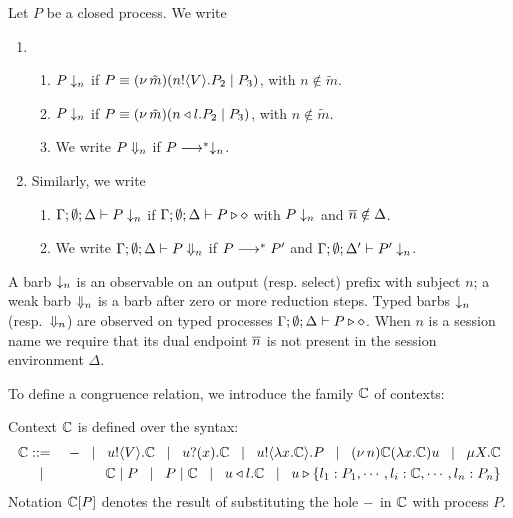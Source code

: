 \begin{definition}[Barbs]
	Let $P$ be a closed process. We write
	\begin{enumerate}
		\item
				\begin{enumerate}
					\item	$P \downarrow_{n}$ if $P \equiv (\nu\, \tilde{m})(n ! \langle V \rangle . P_2 \;|\; P_3)$, with $n \notin \tilde{m}$.
					\item	$P \downarrow_{n}$ if $P \equiv (\nu\, \tilde{m})(n \triangleleft l . P_2 \;|\; P_3)$, with $n \notin \tilde{m}$.
					\item	We write $P \Downarrow_{n}$ if $P \longrightarrow^* \downarrow_{n}$.
				\end{enumerate}

		\item	Similarly, we write
				\begin{enumerate}
					\item	$\Gamma; \emptyset; \Delta \vdash P \downarrow_{n}$ if
							$\Gamma; \emptyset; \Delta \vdash P \triangleright \diamond$ with $P \downarrow_{n}$ and $\overline{n} \notin \Delta$.
					\item	We write $\Gamma; \emptyset; \Delta \vdash P \Downarrow_{n}$ if $P \longrightarrow^* P'$ and
							$\Gamma; \emptyset; \Delta' \vdash P' \downarrow_{n}$.
				\end{enumerate}
	\end{enumerate}
\end{definition}

\noi A barb $\downarrow_{n}$ is an observable on an output (resp. select) prefix with subject $n$;
a weak barb $\Downarrow_{n}$ is a barb after zero or more reduction steps.
Typed barbs $\downarrow_{n}$ (resp.\ $\Downarrow_{n}$)
are observed  on typed processes $\Gamma; \emptyset; \Delta \vdash P \triangleright \diamond$.
When $n$ is a session name we require that its dual endpoint $\overline{n}$ is not
present in the session environment $\Delta$.

To define a congruence relation, we introduce the family ${\mathbb{C}}$ of contexts:

\begin{definition}[Context]
	Context ${\mathbb{C}}$ is defined over the syntax:
%
	\begin{eqnarray*}
		{\mathbb{C}} & ::= & - \;\;\;|\;\;\; u ! \langle V \rangle . {\mathbb{C}} \;\;\;|\;\;\; u ? (x) . {\mathbb{C}} \;\;\;|\;\;\; u ! \langle \lambda x.{\mathbb{C}} \rangle . P \;\;\;|\;\;\; (\nu\, n) {\mathbb{C}}
		(\lambda x.{\mathbb{C}})u \;\;\;|\;\;\; \mu X. {\mathbb{C}}\\ 
		& \;\;\;|\;\;\; & {\mathbb{C}} \;|\; P \;\;\;|\;\;\; P \;|\; {\mathbb{C}} \;\;\;|\;\;\; u \triangleleft l . {\mathbb{C}} \;\;\;|\;\;\; u \triangleright \{l_1:P_1,\cdots,l_i:{\mathbb{C}},\cdots,l_n:P_n\}
	\end{eqnarray*}
%
	Notation ${\mathbb{C}}[P]$ denotes the result of substituting 
	the hole $-$ in ${\mathbb{C}}$ with process $P$.
\end{definition}

